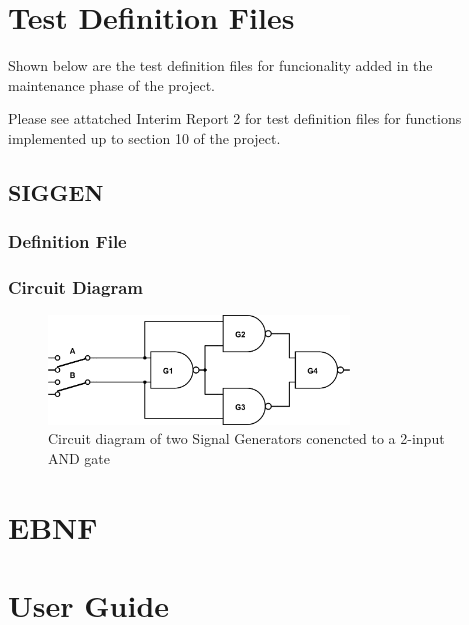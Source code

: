 \documentclass[a4paper,10pt]{article}
\begin{document}
\section{Test Definition Files}

Shown below are the test definition files for funcionality added in the maintenance phase of the project.

Please see attatched Interim Report 2 for test definition files for functions implemented up to section 10 of the project.

\subsection{SIGGEN}

\subsubsection{Definition File}


\subsubsection{Circuit Diagram}
\begin{figure}[h]
 \centering
 \includegraphics[width=8cm]{../../examples/xor.png} %
 \caption{Circuit diagram of two Signal Generators conencted to a 2-input AND gate}
 \label{fig:example-siggen}
\end{figure}

\pagebreak

\section{EBNF}

\pagebreak

\section{User Guide}
\end{document}
